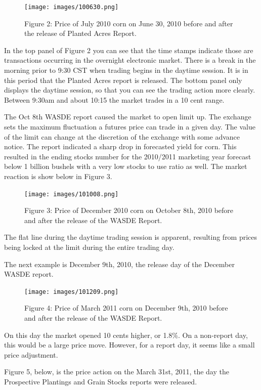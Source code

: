 \documentclass[
]{book}
\begin{document}
\begin{figure}
\centering
\texttt{[image: images/100630.png]}
\caption{Figure 2: Price of July 2010 corn on June 30, 2010 before and after the release of Planted Acres Report.}
\end{figure}

In the top panel of Figure 2 you can see that the time stamps indicate those are transactions occurring in the overnight electronic market. There is a break in the morning prior to 9:30 CST when trading begins in the daytime session. It is in this period that the Planted Acres report is released. The bottom panel only displays the daytime session, so that you can see the trading action more clearly. Between 9:30am and about 10:15 the market trades in a 10 cent range.

The Oct 8th WASDE report caused the market to open limit up. The exchange sets the maximum fluctuation a futures price can trade in a given day. The value of the limit can change at the discretion of the exchange with some advance notice. The report indicated a sharp drop in forecasted yield for corn. This resulted in the ending stocks number for the 2010/2011 marketing year forecast below 1 billion bushels with a very low stocks to use ratio as well. The market reaction is show below in Figure 3.

\begin{figure}
\centering
\texttt{[image: images/101008.png]}
\caption{Figure 3: Price of December 2010 corn on October 8th, 2010 before and after the release of the WASDE Report.}
\end{figure}

The flat line during the daytime trading session is apparent, resulting from prices being locked at the limit during the entire trading day.

The next example is December 9th, 2010, the release day of the December WASDE report.

\begin{figure}
\centering
\texttt{[image: images/101209.png]}
\caption{Figure 4: Price of March 2011 corn on December 9th, 2010 before and after the release of the WASDE Report.}
\end{figure}

On this day the market opened 10 cents higher, or 1.8\%. On a non-report day, this would be a large price move. However, for a report day, it seems like a small price adjustment.

Figure 5, below, is the price action on the March 31st, 2011, the day the Prospective Plantings and Grain Stocks reports were released.
\end{document}
